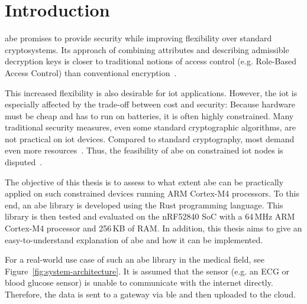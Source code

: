 
\chapter{Introduction}\label{chapter:introduction}

\acrfull{abe} promises to provide security while improving flexibility over standard cryptosystems.
Its approach of combining \glspl{attribute} and  describing admissible decryption keys is closer to traditional notions of access control (e.g. Role-Based Access Control) than conventional encryption~\cite{bethencourt_ciphertext-policy_2007}.

This increased flexibility is also desirable for \acrfull{iot} applications.
However, the \acrshort{iot} is especially affected by the trade-off between cost and security:
Because hardware must be cheap and has to run on batteries, it is often highly constrained.
Many traditional security measures, even some standard cryptographic algorithms, are not practical on \acrshort{iot} devices.
Compared to standard cryptography, most  demand even more resources~\cite{wang_performance_2014}.
Thus, the feasibility of \acrshort{abe} on constrained \acrshort{iot} nodes is disputed~\cite{ambrosin_feasibility_2016,ambrosin_feasibility_2015,borgh_attribute-based_2016,girgenti_feasibility_2019,wang_performance_2014}.

The objective of this thesis is to assess to what extent \acrshort{abe} can be practically applied on such constrained devices running ARM Cortex-M4 processors.
To this end, an \acrshort{abe} library is developed using the Rust programming language.
This library is then tested and evaluated on the nRF52840 SoC with a 64\,MHz ARM Cortex-M4 processor and 256\,KB of RAM.
In addition, this thesis aims to give an easy-to-understand explanation of \acrshort{abe} and how it can be implemented.



For a real-world use case of such an \acrshort{abe} library in the medical field, see Figure~\ref{fig:system-architecture}. %
It is assumed that the sensor (e.g. an ECG or blood glucose sensor) is unable to communicate with the internet directly.
Therefore, the data is sent to a gateway via \acrfull{ble} and then uploaded to the cloud.

